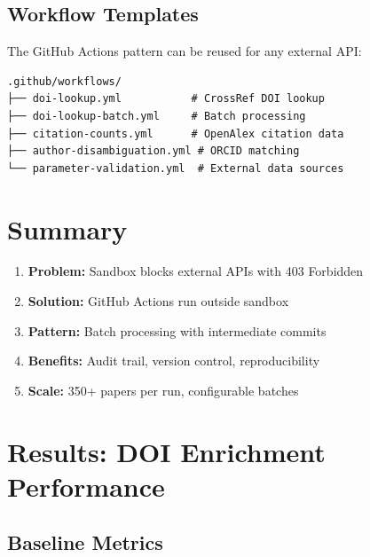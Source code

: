 \subsection{Workflow Templates}

The GitHub Actions pattern can be reused for any external API:

\begin{verbatim}
.github/workflows/
├── doi-lookup.yml           # CrossRef DOI lookup
├── doi-lookup-batch.yml     # Batch processing
├── citation-counts.yml      # OpenAlex citation data
├── author-disambiguation.yml # ORCID matching
└── parameter-validation.yml  # External data sources
\end{verbatim}

\section{Summary}
\label{sec:api-summary}

\begin{tcolorbox}[colback=green!5, colframe=green!50, title=Key Takeaways]
\begin{enumerate}
    \item \textbf{Problem:} Sandbox blocks external APIs with 403 Forbidden
    \item \textbf{Solution:} GitHub Actions run outside sandbox
    \item \textbf{Pattern:} Batch processing with intermediate commits
    \item \textbf{Benefits:} Audit trail, version control, reproducibility
    \item \textbf{Scale:} 350+ papers per run, configurable batches
\end{enumerate}
\end{tcolorbox}

\section{Results: DOI Enrichment Performance}
\label{sec:api-results}

\subsection{Baseline Metrics}

